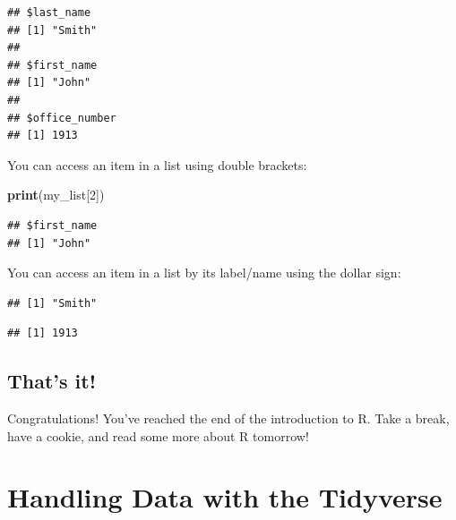 \documentclass[
]{krantz}
\makeatletter
\newenvironment{Shaded}{\begin{snugshade}}{\end{snugshade}}
\newcommand{\DecValTok}[1]{\textcolor[rgb]{0.06,0.06,0.06}{#1}}
\newcommand{\KeywordTok}[1]{\textcolor[rgb]{0.27,0.27,0.27}{\textbf{#1}}}
\newcommand{\NormalTok}[1]{#1}
\newcommand{\OperatorTok}[1]{\textcolor[rgb]{0.43,0.43,0.43}{\textbf{#1}}}
\newenvironment{kframe}{%
\medskip{}
\setlength{\fboxsep}{.8em}
 \def\at@end@of@kframe{}%
 \ifinner\ifhmode%
  \def\at@end@of@kframe{\end{minipage}}%
  \begin{minipage}{\columnwidth}%
 \fi\fi%
 \def\FrameCommand##1{\hskip\@totalleftmargin \hskip-\fboxsep
 \colorbox{shadecolor}{##1}\hskip-\fboxsep
     \hskip-\linewidth \hskip-\@totalleftmargin \hskip\columnwidth}%
 \MakeFramed {\advance\hsize-\width
   \@totalleftmargin\z@ \linewidth\hsize
   \@setminipage}}%
 {\par\unskip\endMakeFramed%
 \at@end@of@kframe}
\renewenvironment{Shaded}{\begin{kframe}}{\end{kframe}}
\makeatother
\begin{document}
\begin{verbatim}
## $last_name
## [1] "Smith"
## 
## $first_name
## [1] "John"
## 
## $office_number
## [1] 1913
\end{verbatim}

You can access an item in a list using double brackets:

\begin{Shaded}
\begin{Highlighting}[]
\KeywordTok{print}\NormalTok{(my_list[}\DecValTok{2}\NormalTok{])}
\end{Highlighting}
\end{Shaded}

\begin{verbatim}
## $first_name
## [1] "John"
\end{verbatim}

You can access an item in a list by its label/name using the dollar sign:

\begin{Shaded}
\end{Shaded}

\begin{verbatim}
## [1] "Smith"
\end{verbatim}

\begin{Shaded}
\end{Shaded}

\begin{verbatim}
## [1] 1913
\end{verbatim}

\hypertarget{thats-it}{%
\section{That's it!}\label{thats-it}}

Congratulations! You've reached the end of the introduction to R. Take a break, have a cookie, and read some more about R tomorrow!

\hypertarget{handling-data-with-the-tidyverse}{%
\chapter{Handling Data with the Tidyverse}\label{handling-data-with-the-tidyverse}}
\end{document}
